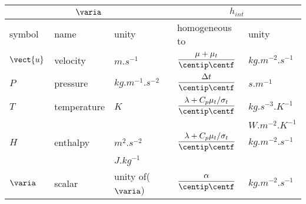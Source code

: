 \begin{table}
\begin{center}
\begin{tabular}{||l|l|l||l|l||}
\hline
\multicolumn{3}{||c||}{$\varia$} & \multicolumn{2}{c||}{$h_{int}$}     \\
\hline
symbol                        & name                        & unity                    & homogeneous to                        & unity            \\
\hline
$\vect{u}$                    & velocity                    & $m.s^{-1}$               &$\dfrac{\mu+\mu_t}{ \centip \centf}$   & $kg.m^{-2}.s^{-1}$       \\
$P$                           & pressure                    & $kg.m^{-1}.s^{-2}$       & $\dfrac{\Delta t}{ \centip \centf}$   & $s.m^{-1}$                \\
$T$                           & temperature                 & $K$                      &$\dfrac{\lambda+C_p\mu_t/\sigma_t}{ \centip \centf}$  &$kg.s^{-3}.K^{-1}$\\
                              &                             &                          &                                       & $W.m^{-2}.K^{-1}$\\
$H$                           & enthalpy                    & $m^{2}.s^{-2}$           &$\dfrac{\lambda+C_p\mu_t/\sigma_t}{ \centip \centf}$ &$kg.m^{-2}.s^{-1}$\\
                              &                             & $J.kg^{-1} $             &                                                            &                                  \\
$\varia$                      & scalar                      & unity of($\varia$)       &$\dfrac{\alpha}{ \centip \centf}$      & $kg.m^{-2}.s^{-1}$       \\
\hline
\end{tabular}
\end{center}


\end{table}

